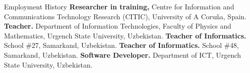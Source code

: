 \begin{rubric}{\faBriefcase Employment History}
\entry*[2020 -- now]%
	\textbf{Researcher in training,} Centre for Information and Communications Technology Research (CITIC), University of A Coruña, Spain.
%
%
\entry*[2017 -- 2018]%
	\textbf{Teacher.} Department of Information Technologies, Faculty of Physics and Mathematics, Urgench State University, Uzbekistan.
%
\entry*[2016 -- 2017]%
	\textbf{Teacher of Informatics.} School \#27, Samarkand, Uzbekistan.
%
\entry*[2014 -- 2015]%
	\textbf{Teacher of Informatics.} School \#48, Samarkand, Uzbekistan.
%
\entry*[2013 -- 2014]%
	\textbf{Software Developer.} Department of ICT, Urgench State University, Uzbekistan.
%
\end{rubric}